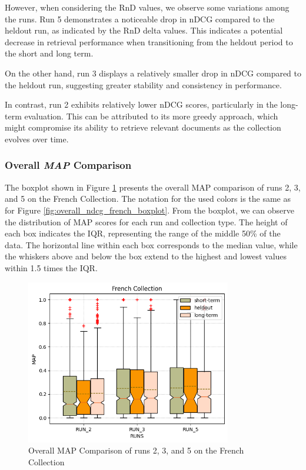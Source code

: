 However, when considering the \ac{RnD} values, we observe some variations among the runs. 
Run 5 demonstrates a noticeable drop in \ac{nDCG} compared to the heldout run, as indicated by the \ac{RnD} delta values. 
This indicates a potential decrease in retrieval performance when transitioning from the heldout period to the short and long term.

On the other hand, run 3 displays a relatively smaller drop in \ac{nDCG} compared to the heldout run, suggesting greater stability and consistency in performance.

In contrast, run 2 exhibits relatively lower \ac{nDCG} scores, particularly in the long-term evaluation. This can be attributed to its more greedy approach, which might compromise its ability to retrieve relevant documents as the collection evolves over time.



\subsubsection{Overall \textit{MAP} Comparison} \label{sec:map_comparison_french}
The boxplot shown in Figure \ref{fig:map_french} presents the overall \ac{MAP} comparison of runs 2, 3, and 5 on the French Collection.
The notation for the used colors is the same as for Figure \ref{fig:overall_ndcg_french_boxplot}.
From the boxplot, we can observe the distribution of \ac{MAP} scores for each run and collection type. The height of each box indicates the \ac{IQR}, representing the range of the middle 50\% of the data. 
The horizontal line within each box corresponds to the median value, while the whiskers above and below the box extend to the highest and lowest values within 1.5 times the \ac{IQR}.

\begin{figure}[!h]
    \centering
    \includegraphics[width=0.8\textwidth]{figure/StatisticalAnalysis/BoxPlot/MAP French.png}
    \caption{Overall MAP Comparison of runs 2, 3, and 5 on the French Collection}
    \label{fig:map_french}
\end{figure}

